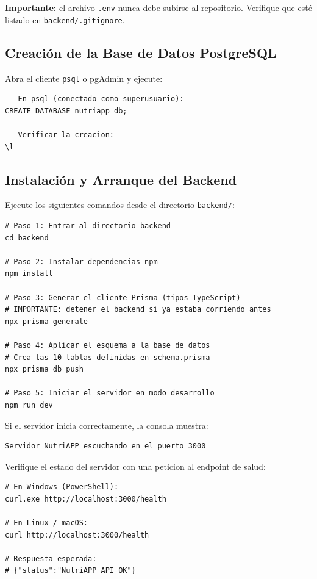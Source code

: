 \documentclass[12pt,a4paper]{article}
\begin{document}
\textbf{Importante:} el archivo \texttt{.env} nunca debe subirse al repositorio.
Verifique que esté listado en \texttt{backend/.gitignore}.

\subsection{Creación de la Base de Datos PostgreSQL}

Abra el cliente \texttt{psql} o pgAdmin y ejecute:

\begin{lstlisting}[style=shell,caption={Crear la base de datos nutriapp\_db en PostgreSQL}]
-- En psql (conectado como superusuario):
CREATE DATABASE nutriapp_db;

-- Verificar la creacion:
\l
\end{lstlisting}

\subsection{Instalación y Arranque del Backend}

Ejecute los siguientes comandos desde el directorio \texttt{backend/}:

\begin{lstlisting}[style=shell,caption={Instalacion completa del backend}]
# Paso 1: Entrar al directorio backend
cd backend

# Paso 2: Instalar dependencias npm
npm install

# Paso 3: Generar el cliente Prisma (tipos TypeScript)
# IMPORTANTE: detener el backend si ya estaba corriendo antes
npx prisma generate

# Paso 4: Aplicar el esquema a la base de datos
# Crea las 10 tablas definidas en schema.prisma
npx prisma db push

# Paso 5: Iniciar el servidor en modo desarrollo
npm run dev
\end{lstlisting}

Si el servidor inicia correctamente, la consola muestra:

\begin{lstlisting}[style=shell]
Servidor NutriAPP escuchando en el puerto 3000
\end{lstlisting}

Verifique el estado del servidor con una peticion al endpoint de salud:

\begin{lstlisting}[style=shell,caption={Verificar el endpoint GET /health}]
# En Windows (PowerShell):
curl.exe http://localhost:3000/health

# En Linux / macOS:
curl http://localhost:3000/health

# Respuesta esperada:
# {"status":"NutriAPP API OK"}
\end{lstlisting}
\end{document}
